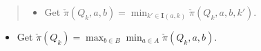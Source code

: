 \documentclass[a4paper,10pt,english]{sphinxmanual}
\begin{document}
{\begin{minipage}{0.95\linewidth}
\begin{quote}
\begin{itemize}
\begin{quote}
\begin{quote}
\begin{itemize}
\item {} 
Solve separable BLP

\end{itemize}
\begin{gather}
\begin{split}\check{\pi}(Q_k,a,b,k') &
= \min_{\lambda \in Q_k,w} \lambda [ (1-\delta)v(a,b) + \delta P w ]
\\
s.t. &
\\
M_{k'} (\lambda P)^T & \leq d_{k'}
\\
\lambda b^T & \leq 0
\\
H w & \leq c^{o}(Q_k', \cdot)
\\
\delta[p^j(a')-p^j(a_j)]\cdot w & \leq (1-\delta) [\phi(a')-\phi(a_j)], \  \forall j \in \mathcal{Z}\end{split}\notag
\end{gather}\end{quote}
\end{quote}

\item {} 
Get $\check{\pi}(Q_k,a,b) = \min_{k' \in \mathbf{I}(a,k)} \check{\pi}(Q_k,a,b,k')$.

\end{itemize}
\end{quote}
\begin{itemize}
\item {} 
Get $\check{\pi}(Q_k)  = \max_{b \in B} \min_{a \in A}\check{\pi}(Q_k,a,b)$.

\end{itemize}
\end{minipage}}
\begin{center}\setlength{\fboxsep}{5pt}\end{center}

\begin{DUlineblock}{0em}
\item[] 
\end{DUlineblock}
\end{document}
